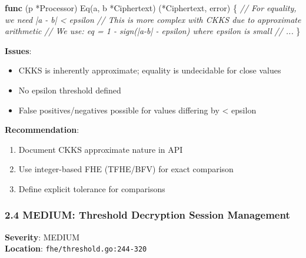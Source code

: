 \documentclass[
]{article}
\newenvironment{Shaded}{}{}
\newcommand{\CommentTok}[1]{\textcolor[rgb]{0.38,0.63,0.69}{\textit{#1}}}
\newcommand{\DataTypeTok}[1]{\textcolor[rgb]{0.56,0.13,0.00}{#1}}
\newcommand{\KeywordTok}[1]{\textcolor[rgb]{0.00,0.44,0.13}{\textbf{#1}}}
\newcommand{\NormalTok}[1]{#1}
\newcommand{\OperatorTok}[1]{\textcolor[rgb]{0.40,0.40,0.40}{#1}}
\providecommand{\tightlist}{%
  \setlength{\itemsep}{0pt}\setlength{\parskip}{0pt}}
\begin{document}
\begin{Shaded}
\begin{Highlighting}[]
\KeywordTok{func} \OperatorTok{(}\NormalTok{p }\OperatorTok{*}\NormalTok{Processor}\OperatorTok{)}\NormalTok{ Eq}\OperatorTok{(}\NormalTok{a}\OperatorTok{,}\NormalTok{ b }\OperatorTok{*}\NormalTok{Ciphertext}\OperatorTok{)} \OperatorTok{(*}\NormalTok{Ciphertext}\OperatorTok{,} \DataTypeTok{error}\OperatorTok{)} \OperatorTok{\{}
    \CommentTok{// For equality, we need |a {-} b| \textless{} epsilon}
    \CommentTok{// This is more complex with CKKS due to approximate arithmetic}
    \CommentTok{// We use: eq = 1 {-} sign(|a{-}b| {-} epsilon) where epsilon is small}
    \CommentTok{// ...}
\OperatorTok{\}}
\end{Highlighting}
\end{Shaded}

\textbf{Issues}:

\begin{itemize}
\tightlist
\item
  CKKS is inherently approximate; equality is undecidable for close
  values
\item
  No epsilon threshold defined
\item
  False positives/negatives possible for values differing by \textless{}
  epsilon
\end{itemize}

\textbf{Recommendation}:

\begin{enumerate}
\def\labelenumi{\arabic{enumi}.}
\tightlist
\item
  Document CKKS approximate nature in API
\item
  Use integer-based FHE (TFHE/BFV) for exact comparison
\item
  Define explicit tolerance for comparisons
\end{enumerate}

\subsubsection{2.4 MEDIUM: Threshold Decryption Session
Management}\label{24-medium-threshold-decryption-session-management}

\textbf{Severity}: MEDIUM\\
\textbf{Location}: \texttt{fhe/threshold.go:244-320}
\end{document}
